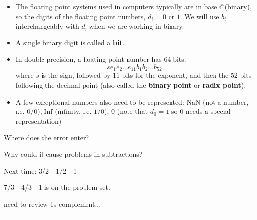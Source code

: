 \documentclass[12pt,letterpaper,noanswers]{exam}
\begin{document}
\begin{tcolorbox}
\begin{itemize}
\itemsep0pt
    \item The floating point systems used in computers typically are in base $@$(binary), so the digits of the floating point numbers, $d_i = 0$ or $1$.  We will use $b_i$ interchangeably with $d_i$ when we are working in binary.
    \item A single binary digit is called a \textbf{bit}.
    \item In double precision, a floating point number has $64$ bits.  \[s e_1e_2...e_{11}b_1b_2...b_{52}\] where $s$ is the sign, followed by $11$ bits for the exponent, and then the $52$ bits following the decimal point (also called the \textbf{binary point} or \textbf{radix point}).
    \item A few exceptional numbers also need to be represented: NaN (not a number, i.e. 0/0), Inf (infinity, i.e. $1/0$), 0 (note that $d_0 = 1$ so $0$ needs a special representation)
\end{itemize}
\end{tcolorbox}

Where does the error enter?

Why could it cause problems in subtractions?

Next time: 3/2 - 1/2 - 1

7/3 - 4/3 - 1 is on the problem set.

need to review 1s complement...

\vspace{0.2cm}
\hrule
\vspace{0.2cm}




% 
% 
\end{document}
